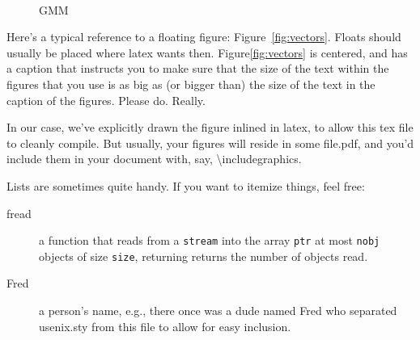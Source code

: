 \documentclass[a4paper,10pt,titlepage]{article}
\begin{document}
\begin{figure}[!htbp]
	\centering
	\\
	\caption{GMM}
	\label{fig:gmm}
\end{figure}

Here's a typical reference to a floating figure:
Figure~\ref{fig:vectors}. Floats should usually be placed where latex
wants then. Figure\ref{fig:vectors} is centered, and has a caption
that instructs you to make sure that the size of the text within the
figures that you use is as big as (or bigger than) the size of the
text in the caption of the figures. Please do. Really.

In our case, we've explicitly drawn the figure inlined in latex, to
allow this tex file to cleanly compile. But usually, your figures will
reside in some file.pdf, and you'd include them in your document
with, say, \textbackslash{}includegraphics.

Lists are sometimes quite handy. If you want to itemize things, feel
free:

\begin{description}
  
\item[fread] a function that reads from a \texttt{stream} into the
  array \texttt{ptr} at most \texttt{nobj} objects of size
  \texttt{size}, returning returns the number of objects read.

\item[Fred] a person's name, e.g., there once was a dude named Fred
  who separated usenix.sty from this file to allow for easy
  inclusion.
\end{description}
\end{document}
